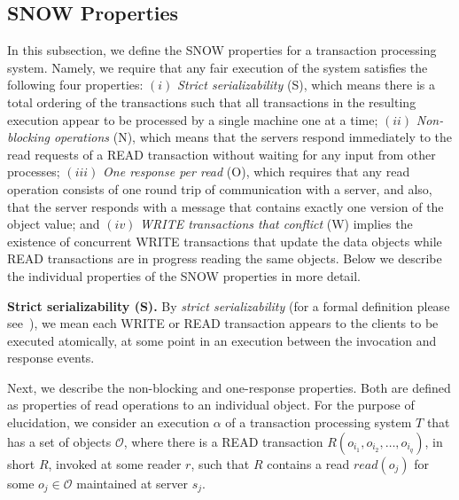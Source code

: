 \subsection{SNOW Properties} 
In this subsection, we define the SNOW properties for a transaction 
processing system.  Namely, we require that any fair execution of the
system satisfies the following
 four properties: $(i)$ \emph{Strict serializability} (S), which means there is a total ordering  of the transactions such that  all transactions in the resulting execution  appear to be processed by  a single machine one at a time; $(ii)$ \emph{Non-blocking operations} (N), which  means that the servers respond immediately to the read requests of a READ transaction without waiting for any input from other processes; $(iii)$ \emph{One response per read} (O), which requires that any read operation  consists of one round trip of communication with a server,  and also, that  the server responds with a message that contains exactly  one version of the  object value; and $(iv)$ \emph{WRITE transactions that conflict} (W) implies the  existence of concurrent WRITE transactions that update the data objects  while READ transactions are in progress reading the same objects.  Below we describe the individual properties of the SNOW properties in more detail.

{\bf Strict serializability (S).} By \emph{strict serializability} (for a formal definition please see~\cite{HW90}), we mean each WRITE or READ transaction appears to the clients to be executed atomically, at some point in an execution  between the invocation and response events.

Next, we describe the non-blocking and one-response 
properties.  Both are defined as properties of read operations to an 
individual object. For the purpose of elucidation, we consider an execution $\alpha$ of a transaction processing system $T$ that has a set of objects $\mathcal{O}$, where there is a READ transaction  $\textit{R}(o_{i_1}, o_{i_2}, \ldots, o_{i_q})$, in short $R$, invoked at some reader $r$, such that $R$ contains a read $read(o_j)$ for some $o_j \in \mathcal{O}$ maintained at server $s_j$.
%

